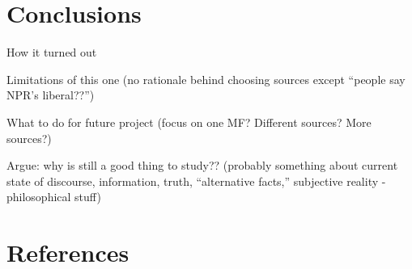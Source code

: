 \documentclass[,man]{apa6}
\theoremstyle{definition}
\theoremstyle{definition}
\theoremstyle{definition}
\theoremstyle{remark}
\begin{document}
\hypertarget{conclusions}{%
\section{Conclusions}\label{conclusions}}

How it turned out

Limitations of this one (no rationale behind choosing sources except
\enquote{people say NPR's liberal??})

What to do for future project (focus on one MF? Different sources? More
sources?)

Argue: why is still a good thing to study?? (probably something about
current state of discourse, information, truth, \enquote{alternative
facts,} subjective reality - philosophical stuff)

\newpage

\hypertarget{references}{%
\section{References}\label{references}}

\begingroup
\setlength{\parindent}{-0.5in}
\setlength{\leftskip}{0.5in}

\hypertarget{refs}{}

\endgroup
\end{document}
